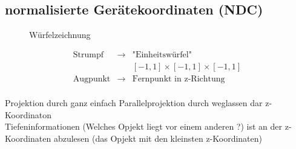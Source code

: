 \documentclass[11pt]{article}
\begin{document}
\subsection{normalisierte Gerätekoordinaten (NDC)}

\begin{figure}[!hb]
\begin{minipage}[l]{5cm}
{\color{red} Würfelzeichnung}
\end{minipage}
\hfill
\begin{minipage}[l]{5cm}
\begin{eqnarray*}
\text{Strumpf} &\rightarrow & \text{"Einheitswürfel"}\\
& & \left[-1,1\right] \times \left[-1,1\right] \times \left[-1,1\right]\\
\text{Augpunkt} &\rightarrow & \text{Fernpunkt in z-Richtung}\\
\end{eqnarray*}
\end{minipage}
\end{figure}
Projektion durch ganz einfach Parallelprojektion durch weglassen dar z-Koordinaton\\
Tiefeninformationen (Welches Opjekt liegt vor einem anderen ?) ist an der z-Koordinaten abzulesen (das Opjekt mit den kleinsten z-Koordinaten)
\end{document}
